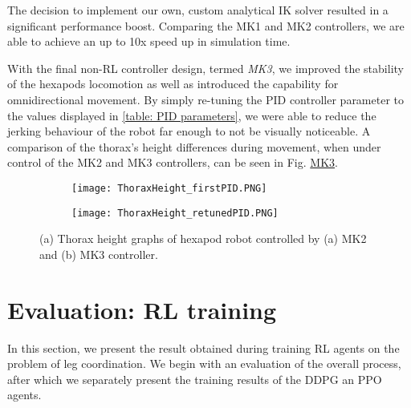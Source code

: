 The decision to implement our own, custom analytical IK solver resulted in a significant performance boost.
Comparing the MK1 and MK2 controllers, we are able to achieve an up to 10x speed up in simulation time.

With the final non-RL controller design, termed \textit{MK3}, we improved the stability of the hexapods locomotion as well as introduced the capability for omnidirectional movement.
By simply re-tuning the PID controller parameter to the values displayed in \ref{table: PID parameters}, we were able to reduce the jerking behaviour of the robot far enough to not be visually noticeable.
A comparison of the thorax's height differences during movement, when under control of the MK2 and MK3 controllers, can be seen in Fig. \hyperref[vid: MK1]{MK3}.

\begin{figure}[h]
	\begin{subfigure}{\textwidth} %
		\centering
		\texttt{[image: ThoraxHeight\_firstPID.PNG]}  %
		\caption{}
		\label{figure: Thorax Height graph, bad tuning}
	\end{subfigure}
	
	\begin{subfigure}{\textwidth}
		\centering
		\texttt{[image: ThoraxHeight\_retunedPID.PNG]}   %
		\caption{}
		\label{figure: Thorax height graph, re-tuning}
	\end{subfigure}
	\caption[Thorax height graphs]{(a) Thorax height graphs of hexapod robot controlled by (a) MK2 and (b) MK3 controller.}
	\label{figure: THorax height graphs}
\end{figure}



\section{Evaluation: RL training}
In this section, we present the result obtained during training RL agents on the problem of leg coordination.
We begin with an evaluation of the overall process, after which we separately present the training results of the DDPG an PPO agents.

